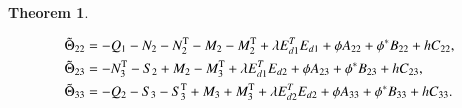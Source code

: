 \documentclass[journal]{IEEEtran}
\newtheorem{theorem}{Theorem}
\begin{document}
\begin{theorem}
\begin{small}
\begin{equation*}
\begin{gathered}
      {{\tilde \Theta }_{22}} =  - {Q_1} - {N_2} - N_2^{\text{T}} - {M_2} - M_2^{\text{T}} + \lambda E_{d1}^T{E_{d1}} + \phi {A_{22}} + {\phi ^*}{B_{22}} + h{C_{22}}, \hfill \\
      {{\tilde \Theta }_{23}} =  - N_3^{\text{T}} - {S_2} + {M_2} - M_3^{\text{T}} + \lambda E_{d1}^T{E_{d2}} + \phi {A_{23}} + {\phi ^*}{B_{23}} + h{C_{23}}, \hfill \\
      {{\tilde \Theta }_{33}} =  - {Q_2} - {S_3} - S_3^{\text{T}} + {M_3} + M_3^{\text{T}} + \lambda E_{d2}^T{E_{d2}} + \phi {A_{33}} + {\phi ^*}{B_{33}} + h{C_{33}}. \hfill \\
    \end{gathered}
  \end{equation*}
\end{small}
  \label{theorem7}
\end{theorem}
\end{document}
